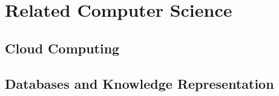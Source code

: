 \chapter{Related Computer Science}

\section{Cloud Computing}

\section{Databases and Knowledge Representation}

